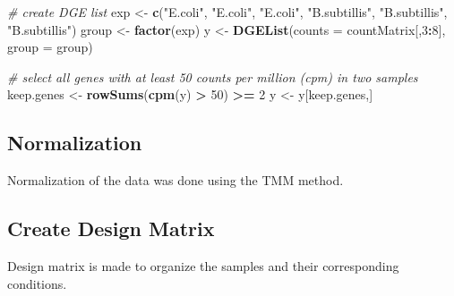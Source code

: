 \documentclass[]{article}
\newenvironment{Shaded}{\begin{snugshade}}{\end{snugshade}}
\newcommand{\KeywordTok}[1]{\textcolor[rgb]{0.13,0.29,0.53}{\textbf{#1}}}
\newcommand{\DataTypeTok}[1]{\textcolor[rgb]{0.13,0.29,0.53}{#1}}
\newcommand{\DecValTok}[1]{\textcolor[rgb]{0.00,0.00,0.81}{#1}}
\newcommand{\StringTok}[1]{\textcolor[rgb]{0.31,0.60,0.02}{#1}}
\newcommand{\CommentTok}[1]{\textcolor[rgb]{0.56,0.35,0.01}{\textit{#1}}}
\newcommand{\OperatorTok}[1]{\textcolor[rgb]{0.81,0.36,0.00}{\textbf{#1}}}
\newcommand{\NormalTok}[1]{#1}
\begin{document}
\begin{Shaded}
\begin{Highlighting}[]
\CommentTok{# create DGE list}
\NormalTok{exp   <-}\StringTok{ }\KeywordTok{c}\NormalTok{(}\StringTok{"E.coli"}\NormalTok{, }\StringTok{"E.coli"}\NormalTok{, }\StringTok{"E.coli"}\NormalTok{, }\StringTok{"B.subtillis"}\NormalTok{, }\StringTok{"B.subtillis"}\NormalTok{, }\StringTok{"B.subtillis"}\NormalTok{)}
\NormalTok{group <-}\StringTok{ }\KeywordTok{factor}\NormalTok{(exp)}
\NormalTok{y     <-}\StringTok{ }\KeywordTok{DGEList}\NormalTok{(}\DataTypeTok{counts =}\NormalTok{ countMatrix[,}\DecValTok{3}\OperatorTok{:}\DecValTok{8}\NormalTok{], }\DataTypeTok{group =}\NormalTok{ group)}
  
\CommentTok{# select all genes with at least 50 counts per million (cpm) in two samples}
\NormalTok{keep.genes <-}\StringTok{ }\KeywordTok{rowSums}\NormalTok{(}\KeywordTok{cpm}\NormalTok{(y) }\OperatorTok{>}\StringTok{ }\DecValTok{50}\NormalTok{) }\OperatorTok{>=}\StringTok{ }\DecValTok{2}
\NormalTok{y <-}\StringTok{ }\NormalTok{y[keep.genes,]}
\end{Highlighting}
\end{Shaded}

\subsection{Normalization}\label{normalization}

Normalization of the data was done using the TMM method.

\begin{Shaded}
\end{Shaded}

\subsection{Create Design Matrix}\label{create-design-matrix}

Design matrix is made to organize the samples and their corresponding
conditions.
\end{document}
